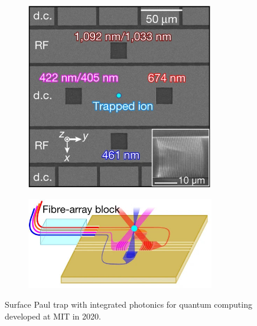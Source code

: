 \begin{figure}[h]
    \centering
    \begin{subfigure}[b]{0.45\textwidth}
        \centering
        \includegraphics[width=0.9\textwidth]{images/TIQC_MIT_1.jpg}
    \end{subfigure}
    \hfill
    \begin{subfigure}[b]{0.45\textwidth}
        \centering
        \includegraphics[width=0.9\textwidth]{images/TIQC_MIT_2.jpg}
    \end{subfigure}
    \caption{Surface Paul trap with integrated photonics for quantum computing developed at MIT in 2020.}\label{fig:TIQC_MIT}
\end{figure}

